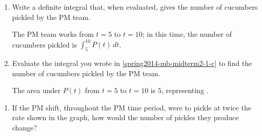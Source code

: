 \documentclass{article}
\begin{document}
\begin{enumerate}
\begin{enumerate}
    \item
      \label{spring2014-mb-midterm2-1-c}
      \begin{problem}[\stretch{0.7}]
        Write a definite integral that, when evaluated, gives the number of
        cucumbers pickled by the PM team.
      \end{problem}

      \begin{solution}
        The PM team works from $t = 5$ to $t = 10$; in this time, the number
        of cucumbers pickled is $\boxed{\int_5^{10} P(t)\,dt}$.
      \end{solution}

    \item
      \begin{problem}[\vfill\newpage]
        Evaluate the integral you wrote in \ref{spring2014-mb-midterm2-1-c}
        to find the number of cucumbers pickled by the PM team.
      \end{problem}

      \begin{solution}
        The area under $P(t)$ from $t = 5$ to $t = 10$ is $5$, representing
        .
      \end{solution}

    \end{enumerate}


    \begin{enumerate}[resume]

    \item
      \begin{problem}[\vfill]
        If the PM shift, throughout the PM time period, were to pickle at
        twice the rate shown in the graph, how would the number of pickles
        they produce change?
      \end{problem}


\end{enumerate}
\end{enumerate}
\end{document}
